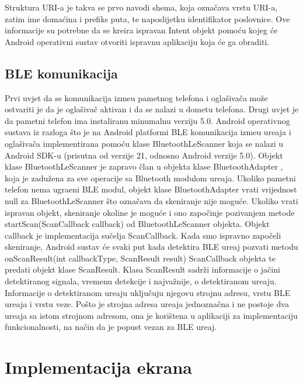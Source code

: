 Struktura URI-a je takva se prvo navodi shema, koja ozna\v{c}ava vrstu URI-a, zatim ime doma\'{c}ina i prefiks puta, te naposlijetku identifikator poslovnice. Ove informacije su potrebne da se kreira ispravan Intent objekt pomo\'{c}u kojeg \'{c}e Android operativni sustav otvoriti ispravnu aplikaciju koja \'{c}e ga obraditi.

\subsection{BLE komunikacija}

Prvi uvjet da se komunikacija izme\dj u pametnog telefona i ogla\v{s}iva\v{c}a mo\v{z}e ostvariti je da je ogla\v{s}iva\v{c} aktivan i da se nalazi u dometu telefona. Drugi uvjet je da pametni telefon ima instaliranu minumalnu verziju 5.0. Android operativnog sustava iz razloga \v{s}to je na Android platformi BLE komunikacija izme\dj u ure\dj aja i ogla\v{s}iva\v{c}a implementirana pomo\'{c}u klase BluetoothLeScanner \cite{bluetoothLeScaner} koja se nalazi u Android SDK-u (prisutna od verzije 21, odnosno Android verzije 5.0).
Objekt klase BluetoothLeScanner je zapravo \v{c}lan u objekta klase BluetoothAdapter \cite{bluetoothAdapter}, koja je zadu\v{z}ena za sve operacije sa Bluetooth modulom ure\dj aja. Ukoliko pametni telefon nema ugra\dj eni BLE modul, objekt klase BluetoothAdapter vrati vrijednost null za BluetoothLeScanner \v{s}to ozna\v{c}ava da skeniranje nije mogu\'{c}e. Ukoliko vrati ispravan objekt, skeniranje okoline je mogu\'{c}e i ono zapo\v{c}inje pozivanjem metode startScan(ScanCallback callback) od BluetoothLeScanner objekta. Objekt callback je implementacija su\v{c}elja ScanCallback. Kada smo ispravno zapo\v{c}eli skeniranje, Android sustav \'{c}e svaki put kada detektira BLE ure\dj aj pozvati metodu onScanResult(int callbackType, ScanResult result) ScanCallback objekta te predati objekt klase ScanResult. Klasa ScanResult sadr\v{z}i informacije o ja\v{c}ini detektiranog signala, vremenu detekcije i najva\v{z}nije, o detektiranom ure\dj aju. Informacije o detektiranom ure\dj aju uklju\v{c}uju njegovu strojnu adresu, vrstu BLE ure\dj aja i vrstu veze. Po\v{s}to je strojna adresa ure\dj aja jednozna\v{c}na i ne postoje dva ure\dj aja sa istom strojnom adresom, ona je kori\v{s}tena u aplikaciji za implementaciju funkcionalnosti, na na\v{c}in da je popust vezan za BLE ure\dj aj.


\section{Implementacija ekrana}

